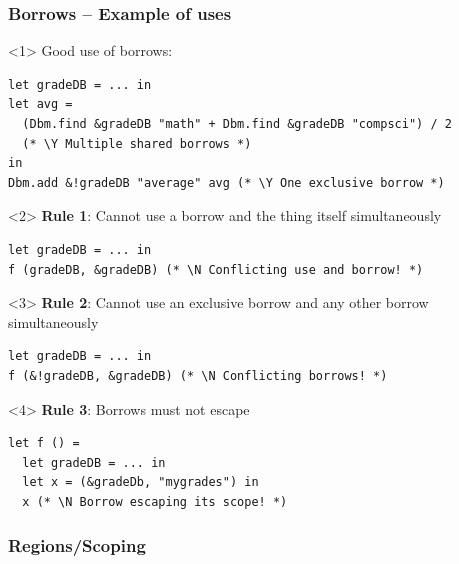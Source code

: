 \documentclass[aspectratio=169,dvipsnames,svgnames,10pt]{beamer}
\newcommand\Y{{\color{Green}{\ding{52}}}}
\newcommand\N{{\color{Red}{\ding{56}}}}
\begin{document}
\begin{frame}[fragile]
  \frametitle{Borrows -- Example of uses}
  \begin{onlyenv}<1>
    Good use of borrows:
\begin{verbatim}
let gradeDB = ... in
let avg =
  (Dbm.find &gradeDB "math" + Dbm.find &gradeDB "compsci") / 2
  (* \Y Multiple shared borrows *)
in
Dbm.add &!gradeDB "average" avg (* \Y One exclusive borrow *)
\end{verbatim}
\end{onlyenv}


\begin{onlyenv}<2>
  \textbf{Rule 1}: Cannot use a borrow and the thing itself simultaneously
\begin{verbatim}
let gradeDB = ... in
f (gradeDB, &gradeDB) (* \N Conflicting use and borrow! *)
\end{verbatim}
\end{onlyenv}
\begin{onlyenv}<3>
  \textbf{Rule 2}: Cannot use an exclusive borrow and any other borrow simultaneously
\begin{verbatim}
let gradeDB = ... in
f (&!gradeDB, &gradeDB) (* \N Conflicting borrows! *)
\end{verbatim}
\end{onlyenv}
\begin{onlyenv}<4>
  \textbf{Rule 3}: Borrows must not escape
\begin{verbatim}
let f () = 
  let gradeDB = ... in
  let x = (&gradeDb, "mygrades") in
  x (* \N Borrow escaping its scope! *)
\end{verbatim}
\end{onlyenv}
\end{frame}

\begin{frame}
  \frametitle{Regions/Scoping}
\end{frame}
\end{document}
